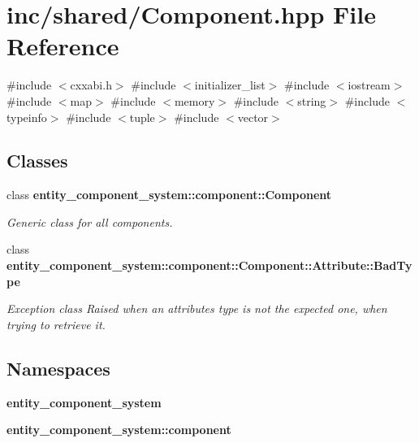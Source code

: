 \section{inc/shared/\+Component.hpp File Reference}
\label{_component_8hpp}
{\ttfamily \#include $<$cxxabi.\+h$>$}\newline
{\ttfamily \#include $<$initializer\+\_\+list$>$}\newline
{\ttfamily \#include $<$iostream$>$}\newline
{\ttfamily \#include $<$map$>$}\newline
{\ttfamily \#include $<$memory$>$}\newline
{\ttfamily \#include $<$string$>$}\newline
{\ttfamily \#include $<$typeinfo$>$}\newline
{\ttfamily \#include $<$tuple$>$}\newline
{\ttfamily \#include $<$vector$>$}\newline
\subsection*{Classes}
\begin{DoxyCompactItemize}
\item 
class {\bf entity\+\_\+component\+\_\+system\+::component\+::\+Component}
\begin{DoxyCompactList}\small\item\em Generic class for all components. \end{DoxyCompactList}\item 
class {\bf entity\+\_\+component\+\_\+system\+::component\+::\+Component\+::\+Attribute\+::\+Bad\+Type}
\begin{DoxyCompactList}\small\item\em Exception class Raised when an attribute\textquotesingle{}s type is not the expected one, when trying to retrieve it. \end{DoxyCompactList}\end{DoxyCompactItemize}
\subsection*{Namespaces}
\begin{DoxyCompactItemize}
\item 
 {\bf entity\+\_\+component\+\_\+system}
\item 
 {\bf entity\+\_\+component\+\_\+system\+::component}
\end{DoxyCompactItemize}
